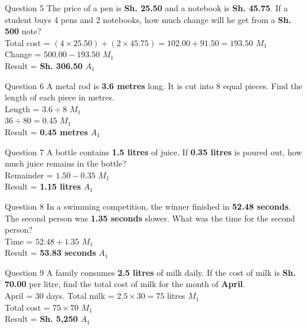 \documentclass[12pt, a4paper, oneside]{article}
\begin{document}
\begin{solvingbox}{Question 5}
The price of a pen is \textbf{Sh. 25.50} and a notebook is \textbf{Sh. 45.75}. If a student buys 4 pens and 2 notebooks, how much change will he get from a \textbf{Sh. 500} note? \\
Total cost = $(4 \times 25.50) + (2 \times 45.75) = 102.00 + 91.50 = 193.50$ \hfill $M_1$ \\
Change = $500.00 - 193.50$ \hfill $M_1$ \\
Result = \textbf{Sh. 306.50} \hfill $A_1$
\end{solvingbox}

\begin{solvingbox}{Question 6}
A metal rod is \textbf{3.6 metres} long. It is cut into 8 equal pieces. Find the length of each piece in metres. \\
Length = $3.6 \div 8$ \hfill $M_1$ \\
$36 \div 80 = 0.45$ \hfill $M_1$ \\
Result = \textbf{0.45 metres} \hfill $A_1$
\end{solvingbox}

\begin{solvingbox}{Question 7}
A bottle contains \textbf{1.5 litres} of juice. If \textbf{0.35 litres} is poured out, how much juice remains in the bottle? \\
Remainder = $1.50 - 0.35$ \hfill $M_1$ \\
Result = \textbf{1.15 litres} \hfill $A_1$
\end{solvingbox}

\begin{solvingbox}{Question 8}
In a swimming competition, the winner finished in \textbf{52.48 seconds}. The second person was \textbf{1.35 seconds} slower. What was the time for the second person? \\
Time = $52.48 + 1.35$ \hfill $M_1$ \\
Result = \textbf{53.83 seconds} \hfill $A_1$
\end{solvingbox}

\begin{solvingbox}{Question 9}
A family consumes \textbf{2.5 litres} of milk daily. If the cost of milk is \textbf{Sh. 70.00} per litre, find the total cost of milk for the month of \textbf{April}. \\
April = 30 days. Total milk = $2.5 \times 30 = 75$ litres \hfill $M_1$ \\
Total cost = $75 \times 70$ \hfill $M_1$ \\
Result = \textbf{Sh. 5,250} \hfill $A_1$
\end{solvingbox}
\end{document}
